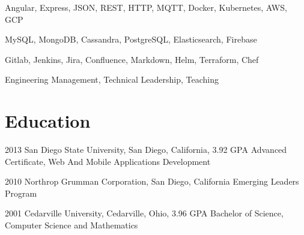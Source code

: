\documentclass{article}
\begin{document}
  {Angular, Express, JSON, REST, HTTP, MQTT, Docker, Kubernetes, AWS, GCP}

  {MySQL, MongoDB, Cassandra, PostgreSQL, Elasticsearch, Firebase}

  {Gitlab, Jenkins, Jira, Confluence, Markdown, Helm, Terraform, Chef}

  {Engineering Management, Technical Leadership, Teaching}


\section{Education}

\education
  {2013}
  {San Diego State University, San Diego, California, 3.92 GPA}
  {Advanced Certificate, Web And Mobile Applications Development}

\education
  {2010}
  {Northrop Grumman Corporation, San Diego, California}
  {Emerging Leaders Program}

\education
  {2001}
  {Cedarville University, Cedarville, Ohio, 3.96 GPA}
  {Bachelor of Science, Computer Science and Mathematics}


\end{document}

